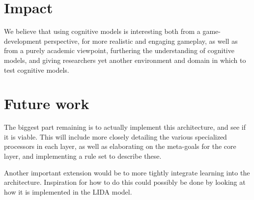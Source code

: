 \section{Impact}
We believe that using cognitive models is interesting both from a
game-development perspective, for more realistic and engaging gameplay, as well
as from a purely academic viewpoint, furthering the understanding of cognitive
models, and giving researchers yet another environment and domain in which to
test cognitive models.

\section{Future work}
The biggest part remaining is to actually implement this architecture, and see
if it is viable. This will include more closely detailing the various
specialized processors in each layer, as well as elaborating on the meta-goals
for the core layer, and implementing a rule set to describe these.

Another important extension would be to more tightly integrate learning into
the architecture. Inspiration for how to do this could possibly be done by
looking at how it is implemented in the LIDA model\cite{franklin2007lida}.